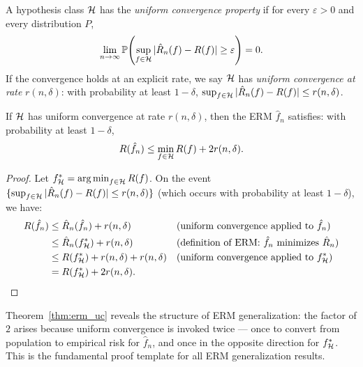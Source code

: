 \documentclass[11pt,a4paper]{article}
\begin{document}
\begin{definition}
\label{def:uniform_convergence}
A hypothesis class $\mathcal{H}$ has the \emph{uniform convergence
property} if for every $\varepsilon > 0$ and every distribution $P$,
\[
    \lim_{n \to \infty} \mathbb{P}\!\left(\sup_{f \in \mathcal{H}}
    |\hat{R}_n(f) - R(f)| \geq \varepsilon\right) = 0.
\]
If the convergence holds at an explicit rate, we say $\mathcal{H}$ has
\emph{uniform convergence at rate} $r(n, \delta)$: with probability
at least $1 - \delta$,
$\sup_{f \in \mathcal{H}} |\hat{R}_n(f) - R(f)| \leq r(n, \delta)$.
\end{definition}

\begin{theorem}
\label{thm:erm_uc}
If $\mathcal{H}$ has uniform convergence at rate $r(n, \delta)$, then
the ERM $\hat{f}_n$ satisfies: with probability at least $1 - \delta$,
\[
    R(\hat{f}_n) \leq \min_{f \in \mathcal{H}} R(f) + 2r(n, \delta).
\]
\end{theorem}

\begin{proof}
Let $f_{\mathcal{H}}^* = \operatorname{arg\,min}_{f \in \mathcal{H}} R(f)$.  On the event
$\{\sup_{f \in \mathcal{H}} |\hat{R}_n(f) - R(f)| \leq r(n, \delta)\}$
(which occurs with probability at least $1 - \delta$), we have:
\begin{align*}
    R(\hat{f}_n)
    &\leq \hat{R}_n(\hat{f}_n) + r(n, \delta)
    && \text{(uniform convergence applied to } \hat{f}_n\text{)} \\
    &\leq \hat{R}_n(f_{\mathcal{H}}^*) + r(n, \delta)
    && \text{(definition of ERM: } \hat{f}_n \text{ minimizes }
    \hat{R}_n\text{)} \\
    &\leq R(f_{\mathcal{H}}^*) + r(n, \delta) + r(n, \delta)
    && \text{(uniform convergence applied to } f_{\mathcal{H}}^*\text{)} \\
    &= R(f_{\mathcal{H}}^*) + 2r(n, \delta). \qedhere
\end{align*}
\end{proof}

\begin{remark}
\label{rem:erm_uc_structure}
Theorem~\ref{thm:erm_uc} reveals the structure of ERM generalization:
the factor of $2$ arises because uniform convergence is invoked twice
--- once to convert from population to empirical risk for $\hat{f}_n$,
and once in the opposite direction for $f_{\mathcal{H}}^*$.  This is the
fundamental proof template for all ERM generalization results.
\end{remark}
\end{document}
